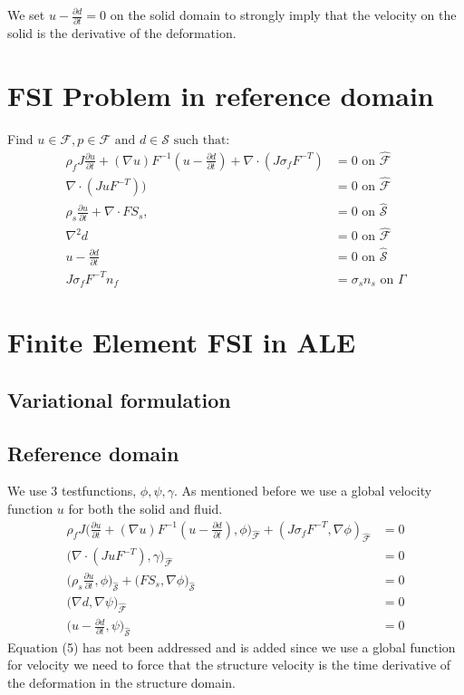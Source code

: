 We  set $u- \frac{\partial d}{\partial t}  = 0  $ on the solid domain to strongly imply that the velocity on the solid is the derivative of the deformation.  

\section*{FSI Problem in reference domain}
Find $u \in \mathcal{F} , p \in \mathcal{F} \text{  and  } d \in \mathcal{S} \text{  such that}:$ 
\begin{align}
\rho_f J \frac{\partial u}{\partial t} + (\nabla u)F^{-1}(u-\frac{\partial d}{\partial t})  + \nabla \cdot( J\sigma_f F^{-T})  &= 0 \text{  on  } \mathcal{\hat{F} } \\
\nabla \cdot (J u F^{-T})\big) &= 0 \text{  on  } \mathcal{\hat{F}}   \\
\rho_s \frac{\partial u}{\partial t} + \nabla \cdot F S_s,&=0  \text{  on  } \mathcal{\hat{S}}\\
\nabla^2 d &= 0  \text{  on  } \mathcal{\hat{F}}\\
u- \frac{\partial d}{\partial t}  &= 0  \text{  on  } \mathcal{\hat{S}}\\
J\sigma_f F^{-T} n_f &= \sigma_s  n_s \text{  on  } \Gamma
\end{align}



\section*{Finite Element FSI in ALE}
\subsection*{Variational formulation}
\subsection*{Reference domain}
We use 3 testfunctions, $\phi, \psi, \gamma$. As mentioned before we use a global velocity function $u$ for both the solid and fluid.
\begin{align}
\rho_f J \big( \frac{\partial u}{\partial t} + (\nabla u)F^{-1}(u-\frac{\partial d}{\partial t}) , \phi\big)_{\mathcal{\hat{F}}} + (J\sigma_f F^{-T},\nabla \phi )_{\mathcal{\hat{F}}} &= 0  \\
 \big( \nabla \cdot (J u F^{-T}),\gamma \big)_{\mathcal{\hat{F}}} &= 0 \\
\big(\rho_s \frac{\partial u}{\partial t},\phi \big)_{\mathcal{\hat{S}}} + \big(F S_s, \nabla \phi \big)_{\mathcal{\hat{S}}} &=0 \\
 \big( \nabla d , \nabla \psi \big)_{\mathcal{\hat{F}}} &= 0 \\
 \big( u- \frac{\partial d}{\partial t} ,\psi \big)_{\mathcal{\hat{S}}} &= 0 
\end{align}
Equation (5) has not been addressed and is added since we use a global function for velocity we need to force that the structure velocity is the time derivative of the deformation in the structure domain. 

